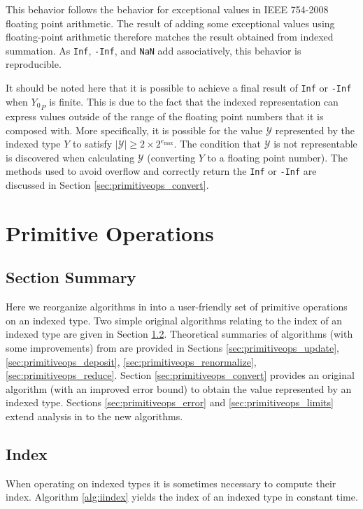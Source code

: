 \documentclass[12pt]{article}
\providecommand{\max}{\ensuremath{\text{max}}}
\theoremstyle{definition}
\numberwithin{equation}{section}
\numberwithin{figure}{section}
\begin{document}
      This behavior follows the behavior for exceptional values in IEEE 754-2008 floating point arithmetic. The result of adding some exceptional values using floating-point arithmetic therefore matches the result obtained from indexed summation. As \texttt{Inf}, \texttt{-Inf}, and \texttt{NaN} add associatively, this behavior is reproducible.

      It should be noted here that it is possible to achieve a final result of \texttt{Inf} or \texttt{-Inf} when ${Y_0}_P$ is finite. This is due to the fact that the indexed representation can express values outside of the range of the floating point numbers that it is composed with. More specifically, it is possible for the value $\mathcal{Y}$ represented by the indexed type $Y$ to satisfy $|\mathcal{Y}| \geq 2 \times 2^{e_{\max}}$. The condition that $\mathcal{Y}$ is not representable is discovered when calculating $\mathcal{Y}$ (converting $Y$ to a floating point number). The methods used to avoid overflow and correctly return the \texttt{Inf} or \texttt{-Inf} are discussed in Section \ref{sec:primitiveops_convert}.

\section{Primitive Operations}
  \subsection{Section Summary}
    Here we reorganize algorithms in \cite{repsum} into a user-friendly set of primitive operations on an indexed type. Two simple original algorithms relating to the index of an indexed type are given in Section \ref{sec:primitiveops_index}. Theoretical summaries of algorithms (with some improvements) from \cite{repsum} are provided in Sections \ref{sec:primitiveops_update}, \ref{sec:primitiveops_deposit}, \ref{sec:primitiveops_renormalize}, \ref{sec:primitiveops_reduce}. Section \ref{sec:primitiveops_convert} provides an original algorithm (with an improved error bound) to obtain the value represented by an indexed type. Sections \ref{sec:primitiveops_error} and \ref{sec:primitiveops_limits} extend analysis in \cite{repsum} to the new algorithms.
  \subsection{Index}
    \label{sec:primitiveops_index}
    When operating on indexed types it is sometimes necessary to compute their index. Algorithm \ref{alg:iindex} yields the index of an indexed type in constant time.
\end{document}
